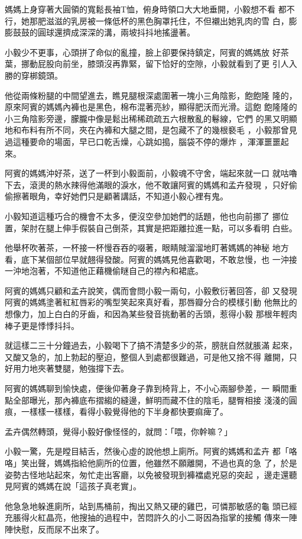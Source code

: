 媽媽上身穿著大圓領的寬鬆長袖T恤，俯身時領口大大地垂開，小毅想不看
都不行，她那肥滋滋的乳房被一條低杯的黑色胸罩托住，不但襯出她乳肉的雪
白，膨膨鼓鼓的圓球還擠成深深的溝，兩坡抖抖地搖盪著。

小毅少不更事，心頭拼了命似的亂撞，臉上卻要保持鎮定，阿賓的媽媽放
好茶葉，挪動屁股向前坐，膝頭沒再靠緊，留下恰好的空隙，小毅就看到了更
引人入勝的穿梆鏡頭。

他從兩條粉腿的中間望進去，瞧見腿根深處圍著一塊小三角陰影，飽飽隆
隆的，原來阿賓的媽媽內褲也是黑色，棉布混著亮紗，顯得肥沃而光滑。這飽
飽隆隆的小三角陰影旁邊，朦朧中像是鬆出稀稀疏疏五六根散亂的鬈線，它們
的黑又明顯地和布料有所不同，夾在內褲和大腿之間，是包藏不了的幾根褻毛
，小毅那曾見過這種要命的場面，早已口乾舌燥，心跳如搗，腦袋不停的爆炸
，渾渾噩噩起來。

阿賓的媽媽沖好茶，送了一杯到小毅面前，小毅魂不守舍，端起來就一口
就咕嚕下去，滾燙的熱水辣得他滿眼的淚水，他不敢讓阿賓的媽媽和孟卉發現
，只好偷偷擦著眼角，幸好她們只是顧著講話，不知道小毅心裡有鬼。

小毅知道這種巧合的機會不太多，便沒空參加她們的話題，他也向前挪了
挪位置，架肘在腿上伸手假裝自己倒茶，其實是把距離拉進一點，可以多看明
白些。

他舉杯吹著茶，一杯接一杯慢吞吞的啜著，眼睛賊溜溜地盯著媽媽的神秘
地方看，底下某個部位早就翹得發酸。阿賓的媽媽見他喜歡喝，不敢怠慢，也
一沖接一沖地泡著，不知道他正藉機偷瞇自己的襟內和裙底。

阿賓的媽媽只顧和孟卉說笑，偶而會問小毅一兩句，小毅敷衍著回答，卻
又發現阿賓的媽媽塗著紅紅唇彩的嘴型笑起來真好看，那唇瓣分合的模樣引動
他無比的想像力，加上白白的牙齒，和因為某些發音挑動著的舌頭，惹得小毅
那根年輕肉棒子更是悸悸抖抖。

就這樣二三十分鐘過去，小毅喝下了搞不清楚多少的茶，膀胱自然就脹滿
起來，又酸又急的，加上勃起的壓迫，整個人到處都很難過，可是他又捨不得
離開，只好用力地夾著雙腿，勉強撐下去。

阿賓的媽媽聊到愉快處，便後仰著身子靠到椅背上，不小心兩腳參差，一
瞬間重點全部曝光，那內褲底布摺縐的縫邊，鮮明而藏不住的陰毛，腿臀相接
淺淺的圓痕，一樣樣一樣樣，看得小毅覺得他的下半身都快要痲痺了。

孟卉偶然轉頭，覺得小毅好像怪怪的，就問：「喂，你幹嘛？」

小毅一驚，先是瞠目結舌，然後心虛的說他想上廁所。阿賓的媽媽和孟卉
都「咯咯」笑出聲，媽媽指給他廁所的位置，他雖然不願離開，不過也真的急
了，於是姿勢古怪地站起來，匆忙走出客廳，以免被發現到褲襠處兇惡的突起
，邊走還聽見阿賓的媽媽在說「這孩子真老實」。

他急急地躲進廁所，站到馬桶前，掏出又熱又硬的雞巴，可憐那敏感的龜
頭已經充脹得火紅晶亮，他搜抽的過程中，苦悶許久的小二哥因為指掌的接觸
傳來一陣陣快慰，反而尿不出來了。


